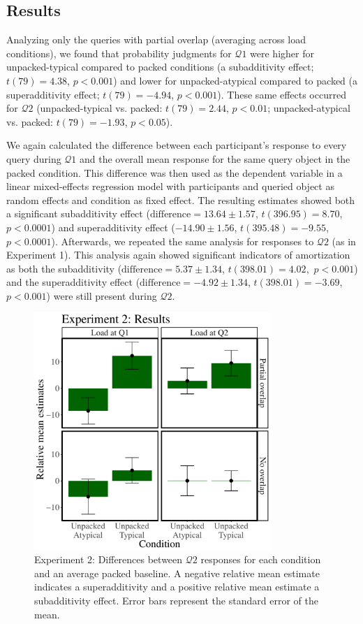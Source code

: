 \subsection{Results}

Analyzing only the queries with partial overlap (averaging across load conditions), we found that probability judgments for $\mathcal{Q}1$ were higher for unpacked-typical compared to packed conditions (a subadditivity effect; $t(79)=4.38$, $p<0.001$) and lower for unpacked-atypical compared to packed (a superadditivity effect; $t(79)=-4.94$, $p<0.001$). These same effects occurred for $\mathcal{Q}2$ (unpacked-typical vs. packed: $t(79)=2.44$, $p<0.01$; unpacked-atypical vs. packed: $t(79)=-1.93$, $p<0.05$). 

We again calculated the difference between each participant's response to every query during $\mathcal{Q}1$ and the overall mean response for the same query object in the packed condition. This difference was then used as the dependent variable in a linear mixed-effects regression model with participants and queried object as random effects and condition as fixed effect. The resulting estimates showed both a significant subadditivity effect ($\text{difference}=13.64\pm1.57$, $t(396.95)=8.70$, $p<0.0001$) and superadditivity effect ($-14.90 \pm1.56$, $t(395.48)=-9.55$, $p<0.0001$). Afterwards, we repeated the same analysis for responses to $\mathcal{Q}2$ (as in Experiment 1). This analysis again showed significant indicators of amortization as both the subadditivity ($\text{difference}=5.37\pm1.34$, $t(398.01)=4.02,$ $p<0.001$) and the superadditivity effect ($\text{difference}=-4.92\pm1.34$, $t(398.01)=-3.69$, $p<0.001$) were still present during $\mathcal{Q}2$. 

\begin{figure}
\centering
\includegraphics[width=0.8\textwidth]{figures/amo2results.pdf}
\caption{Experiment 2: Differences between $\mathcal{Q}2$ responses for each condition and an average packed baseline. A negative relative mean estimate indicates a superadditivity and a positive relative mean estimate a subadditivity effect. Error bars represent the standard error of the mean.}
\label{fig:meandiffs2}
\end{figure}

